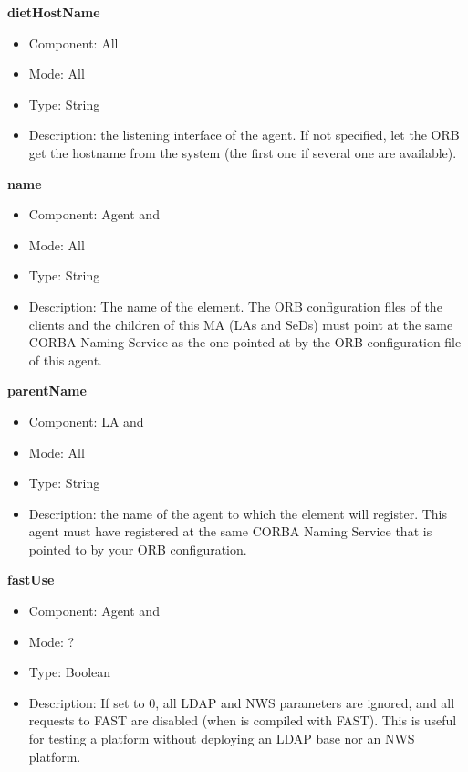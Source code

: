 \begin{description}
\item{\bf{dietHostName}}
  \begin{itemize}
  \item Component: All
  \item Mode: All
  \item Type: String
  \item Description: the listening interface of the agent. If not specified,
    let the ORB get the hostname from the system (the first one if several 
    one are available).
  \end{itemize}

\item{\bf{name}}
  \begin{itemize}
  \item Component: Agent and \sed
  \item Mode: All
  \item Type: String
  \item Description: The name of the element. The ORB configuration files of the clients
    and the children of this MA (LAs and SeDs) must point at the same CORBA
    Naming Service as the one pointed at by the ORB configuration file of
    this agent.
  \end{itemize}

\item{\bf{parentName}}
  \begin{itemize}
  \item Component: LA and \sed
  \item Mode: All
  \item Type: String
  \item Description: the name of the agent to which the element will
    register. This agent must have registered at the same CORBA Naming
    Service that is  pointed to by your ORB configuration.
  \end{itemize}


\item{\bf{fastUse}}
  \begin{itemize}
  \item Component: Agent and \sed
  \item Mode: ?
  \item Type: Boolean
  \item Description: If set to 0, all LDAP and NWS parameters are
    ignored, and all requests to FAST are disabled (when \diet is compiled
    with FAST). This is useful for testing a \diet platform without
    deploying an LDAP base nor an NWS platform.
  \end{itemize}


\end{description}
